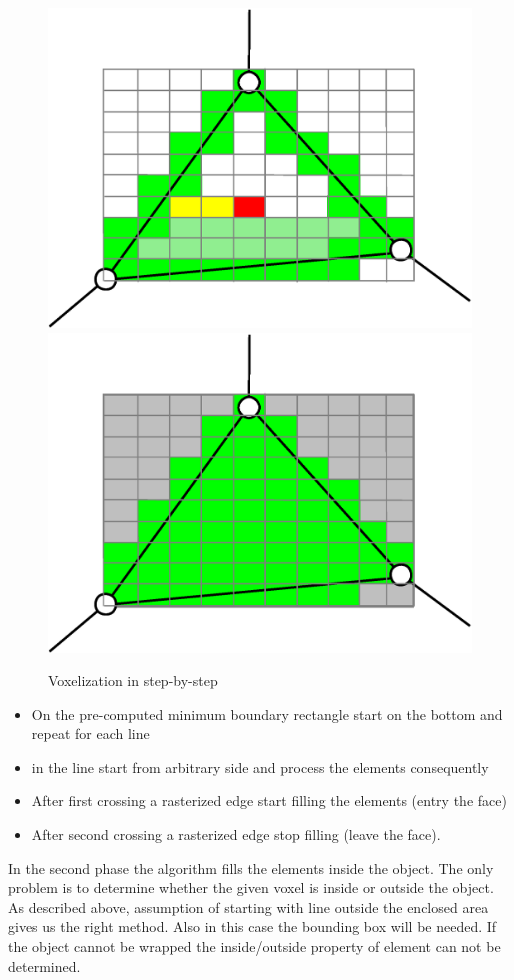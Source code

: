 \begin{figure}
\includegraphics[scale=0.25]{../img/voxelize_3.eps}
\includegraphics[scale=0.25]{../img/voxelize_4.eps}

\caption{Voxelization in step-by-step}
\label{fig:voxelize}

\end{figure}

\begin{itemize}
\item On the pre-computed minimum boundary rectangle start on the bottom and repeat for each line
\item in the line start from arbitrary side and process the elements consequently
\item After first crossing a rasterized edge start filling the elements (entry the face)
\item After second crossing a rasterized edge stop filling (leave the face).

\end{itemize}

In the second phase the algorithm fills the elements inside the object. The only problem is to
determine whether the given voxel is inside or outside the object. As described above, assumption of
starting with line outside the enclosed area gives us the right method. Also in this case the
bounding box will be needed. If the object cannot be wrapped the inside/outside property of element can 
not be determined.
